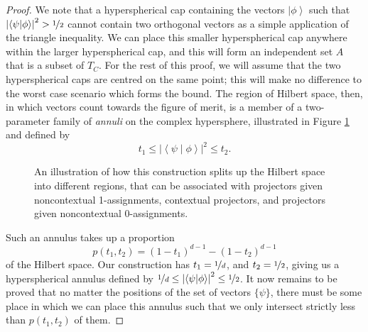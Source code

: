 \documentclass{amsart}
\theoremstyle{definition}
\newcommand{\ket}[1]{{\left\vert{#1}\right\rangle}}
\newcommand{\sprod}[2]{\left|\left< {#1} \middle| {#2} \right>\right|}
\begin{document}
\begin{proof}
We note that a hyperspherical cap containing the vectors $\ket{\phi}$ such that $\sprod{\psi}{\phi}^2> \nicefrac12$ cannot contain two orthogonal vectors as a simple application of the triangle inequality. We can place this smaller hyperspherical cap anywhere within the larger hyperspherical cap, and this will form an independent set $A$ that is a subset of $T_C$. For the rest of this proof, we will assume that the two hyperspherical caps are centred on the same point; this will make no difference to the worst case scenario which forms the bound. The region of Hilbert space, then, in which vectors count towards the figure of merit, is a member of a two-parameter family of \emph{annuli} on the complex hypersphere, illustrated in Figure \ref{annulus} and defined by
\begin{equation}
t_1\leq\sprod{\psi}{\phi}^2\leq t_2.
\end{equation}
\begin{figure}
\caption{An illustration of how this construction splits up the Hilbert space into different regions, that can be associated with projectors given noncontextual 1-assignments, contextual projectors, and projectors given noncontextual 0-assignments.}
\label{annulus}
\end{figure}
Such an annulus takes up a proportion 
\begin{equation}p(t_1,t_2)=\left(1-t_1 \right)^{d-1}-\left(1-t_2 \right)^{d-1}\end{equation}
of the Hilbert space. Our construction has $t_1=\nicefrac1d$, and $t_2=\nicefrac12$, giving us a hyperspherical annulus defined by
$\nicefrac1d\leq\sprod{\psi}{\phi}^2\leq \nicefrac12$.
It now remains to be proved that no matter the positions of the set of vectors $\{\psi\}$, there must be some place in which we can place this annulus such that we only intersect strictly less than $p(t_1,t_2)$ of them. 


\end{proof}
\end{document}
